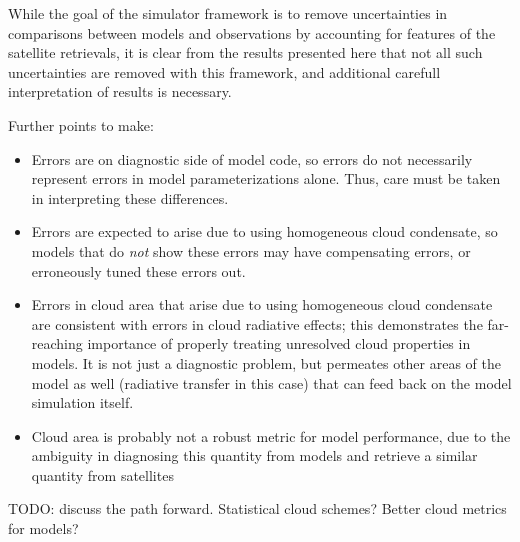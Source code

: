 While the goal of the simulator framework is to remove uncertainties in
comparisons between models and observations by accounting for features
of the satellite retrievals, it is clear from the results presented here
that not all such uncertainties are removed with this framework, and
additional carefull interpretation of results is necessary.

Further points to make:

\begin{itemize}
\tightlist
\item
  Errors are on diagnostic side of model code, so errors do not
  necessarily represent errors in model parameterizations alone. Thus,
  care must be taken in interpreting these differences.
\item
  Errors are expected to arise due to using homogeneous cloud
  condensate, so models that do \emph{not} show these errors may have
  compensating errors, or erroneously tuned these errors out.
\item
  Errors in cloud area that arise due to using homogeneous cloud
  condensate are consistent with errors in cloud radiative effects; this
  demonstrates the far-reaching importance of properly treating
  unresolved cloud properties in models. It is not just a diagnostic
  problem, but permeates other areas of the model as well (radiative
  transfer in this case) that can feed back on the model simulation
  itself.
\item
  Cloud area is probably not a robust metric for model performance, due
  to the ambiguity in diagnosing this quantity from models and retrieve
  a similar quantity from satellites
\end{itemize}

TODO: discuss the path forward. Statistical cloud schemes? Better cloud
metrics for models?
